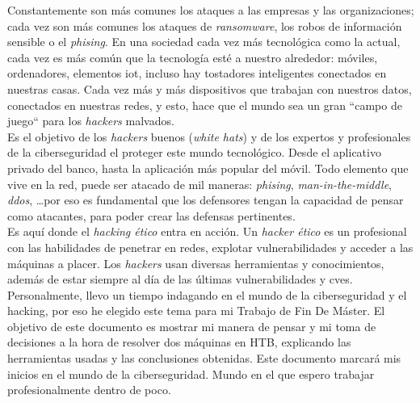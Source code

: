 Constantemente son más comunes los ataques a las empresas y las organizaciones; cada vez son más comunes los ataques de \textit{ransomware}, los robos de información sensible o el \textit{phising}. En una sociedad cada vez más tecnológica como la actual, cada vez es más común que la tecnología esté a nuestro alrededor: móviles, ordenadores, elementos \acrshort{iot}, incluso hay tostadores inteligentes conectados en nuestras casas. Cada vez más y más dispositivos que trabajan con nuestros datos, conectados en nuestras redes, y esto, hace que el mundo sea un gran ``campo de juego`` para los \textit{hackers} malvados.\\

Es el objetivo de los \textit{hackers} buenos (\textit{white hats}) y de los expertos y profesionales de la ciberseguridad el proteger este mundo tecnológico. Desde el aplicativo privado del banco, hasta la aplicación más popular del móvil. Todo elemento que vive en la red, puede ser atacado de mil maneras: \textit{phising}, \textit{man-in-the-middle}, \textit{\acrshort{ddos}}, \ldots por eso es fundamental que los defensores tengan la capacidad de pensar como atacantes, para poder crear las defensas pertinentes.\\

Es aquí donde el \textit{hacking ético} entra en acción. Un \textit{hacker ético} es un profesional con las habilidades de penetrar en redes, explotar vulnerabilidades y acceder a las máquinas a placer. Los \textit{hackers} usan diversas herramientas y conocimientos, además de estar siempre al día de las últimas vulnerabilidades y \acrshort{cve}s.\\

Personalmente, llevo un tiempo indagando en el mundo de la ciberseguridad y el hacking, por eso he elegido este tema para mi Trabajo de Fin De Máster. El objetivo de este documento es mostrar mi manera de pensar y mi toma de decisiones a la hora de resolver dos máquinas en \acrlong{HTB}, explicando las herramientas usadas y las conclusiones obtenidas. Este documento marcará mis inicios en el mundo de la ciberseguridad. Mundo en el que espero trabajar profesionalmente dentro de poco.
